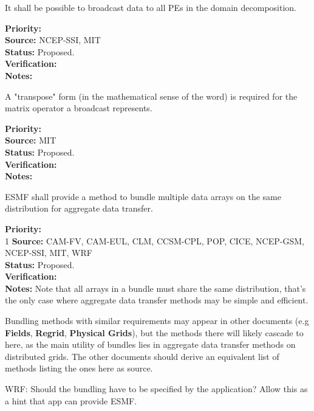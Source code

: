 
It shall be possible to broadcast data to all PEs in the domain decomposition.

\begin{reqlist}
{\bf Priority:} \\ 
{\bf Source:} NCEP-SSI, MIT \\
{\bf Status:} Proposed. \\
{\bf Verification:} \\
{\bf Notes:} 
\end{reqlist}

A "transpose" form (in the mathematical sense of the word) is required
for the matrix operator a broadcast represents.
\begin{reqlist}
{\bf Priority:} \\ 
{\bf Source:}  MIT \\
{\bf Status:} Proposed. \\
{\bf Verification:} \\
{\bf Notes:}
\end{reqlist}


ESMF shall provide a method to bundle multiple data arrays on the same
distribution for aggregate data transfer.

\begin{reqlist}
{\bf Priority:} \\ 1
{\bf Source:} CAM-FV, CAM-EUL, CLM, CCSM-CPL, POP, CICE, NCEP-GSM, NCEP-SSI, MIT, WRF \\
{\bf Status:} Proposed. \\
{\bf Verification:} \\
{\bf Notes:} Note that all arrays in a bundle must share the same
  distribution, that's the only case where aggregate data transfer
  methods may be simple and efficient.
  
  Bundling methods with similar requirements may appear in other
  documents (e.g \textbf{Fields}, \textbf{Regrid}, \textbf{Physical Grids}),
  but the methods there will likely cascade to here, as the main
  utility of bundles lies in aggregate data transfer methods on
  distributed grids. The other documents should derive an equivalent
  list of methods listing the ones here as source.

WRF: Should the bundling have to be specified by the application?  Allow this as a hint that app can provide ESMF.
\end{reqlist}

